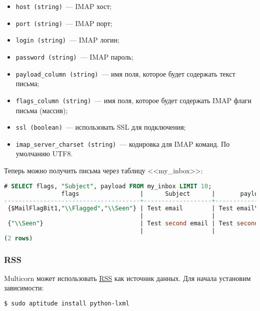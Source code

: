 \begin{itemize}
  \item \lstinline!host (string)!~--- IMAP хост;
  \item \lstinline!port (string)!~--- IMAP порт;
  \item \lstinline!login (string)!~--- IMAP логин;
  \item \lstinline!password (string)!~--- IMAP пароль;
  \item \lstinline!payload_column (string)!~--- имя поля, которое будет содержать текст письма;
  \item \lstinline!flags_column (string)!~--- имя поля, которое будет содержать IMAP флаги письма (массив);
  \item \lstinline!ssl (boolean)!~--- использовать SSL для подключения;
  \item \lstinline!imap_server_charset (string)!~--- кодировка для IMAP команд. По умолчанию UTF8.
\end{itemize}

Теперь можно получить письма через таблицу <<my\_inbox>>:

\begin{lstlisting}[language=SQL,label=lst:pgmulticorn-imap3,caption=Multicorn]
# SELECT flags, "Subject", payload FROM my_inbox LIMIT 10;
                flags                 |      Subject      |       payload
--------------------------------------+-------------------+---------------------
 {$MailFlagBit1,"\\Flagged","\\Seen"} | Test email        | Test email\r       +
                                      |                   |
 {"\\Seen"}                           | Test second email | Test second email\r+
                                      |                   |
(2 rows)
\end{lstlisting}


\subsubsection{RSS}

Multicorn может использовать \href{http://ru.wikipedia.org/wiki/RSS}{RSS} как источник данных. Для начала установим зависимости:

\begin{lstlisting}[language=Bash,label=lst:pgmulticorn-rss1,caption=Multicorn]
$ sudo aptitude install python-lxml
\end{lstlisting}

